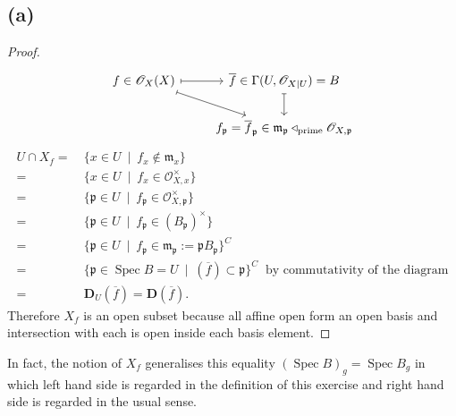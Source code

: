 \subsection{(a)}
\begin{proof}

\[\begin{tikzcd}
	{f\in\mathscr O_X(X)} & {\overline f\in\Gamma(U,\mathscr O_{X\vert U})=B} \\
	& {f_\mathfrak p=\overline f_{\mathfrak p}\in\mathfrak m_{\mathfrak p}\triangleleft_{\text{prime}}\mathscr O_{X,\mathfrak p}}
	\arrow[maps to, from=1-1, to=1-2]
	\arrow[maps to, from=1-2, to=2-2]
	\arrow[maps to, from=1-1, to=2-2]
\end{tikzcd}\]
\begin{align*}
    U\cap X_f =&~ \{x\in U ~\mid~ f_x\notin \mathfrak m_x\}\\
    =&~ \{x\in U ~\mid~ f_x\in \mathscr O_{X,x}^{\times}\}\\
    =&~ \{\mathfrak p\in U ~\mid~ f_{\mathfrak p} \in \mathscr O_{X,\mathfrak p}^{\times}\}\\
    =&~ \{\mathfrak p\in U ~\mid~ f_{\mathfrak p}\in (B_{\mathfrak p})^{\times}\}\\
    =&~ \{\mathfrak p\in U ~\mid~ f_{\mathfrak p}\in \mathfrak m_{\mathfrak p}:=\mathfrak p B_{\mathfrak p}\}^C\\
    =&~ \{\mathfrak p\in \operatorname{Spec}B=U ~\mid~ (\overline f)\subset \mathfrak p\}^C ~\text{ by commutativity of the diagram}\\
    =&~ \mathbf D_U(\overline f)=\mathbf D(\overline f).
\end{align*}
Therefore $X_f$ is an open subset because all affine open form an open basis and intersection with each is open inside each basis element. 
\end{proof}

In fact, the notion of $X_f$ generalises this equality $(\operatorname{Spec}B)_g=\operatorname{Spec}B_g$ in which left hand side is regarded in the definition of this exercise and right hand side is regarded in the usual sense. 

